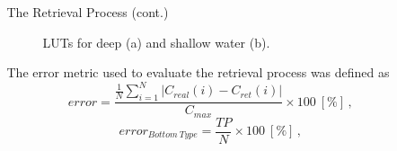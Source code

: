 \documentclass[mathserif]{beamer}
\begin{document}
\begin{frame}{}
\begin{columns}[t]
\begin{column}{.3\linewidth}
\end{column}   
 \begin{column}{.3\linewidth}  %
\begin{block}{The Retrieval Process (cont.)}
\vspace{1cm}
\begin{figure}[t]
\centering
            \caption[LUTs]{LUTs for deep (a) and shallow water (b). \label{fig:LUTs}}
\end{figure}
\vspace{0.8cm}
\justifying\small The error metric used to evaluate the retrieval process was defined as  
\vspace{0.1cm}
\begin{equation}
\label{eq:error}
	error =\frac{\displaystyle\frac{1}{N}\sum_{i=1}^{N} |C_{real}(i) - C_{ret}(i)|} {C_{max}}\times100 ~[\%]\, ,
\end{equation}
\begin{equation}
\label{eq:error}
	error_{Bottom~Type} =\frac{TP} {N}\times100 ~[\%]\, ,
\end{equation}
\vspace{1cm}

\end{block}
\end{column}
\end{columns}
\end{frame}
\end{document}
